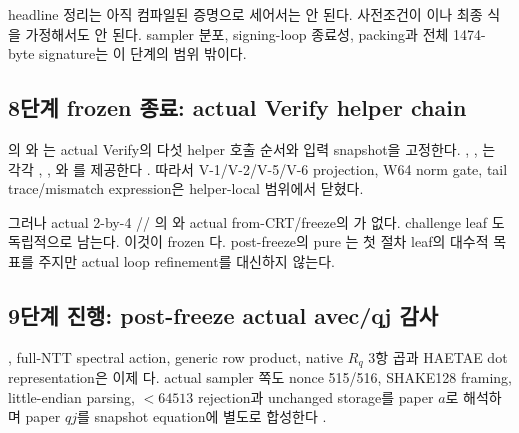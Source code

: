 headline 정리는 아직 컴파일된 증명으로 세어서는 안 된다.
사전조건이 이나 최종 식을 가정해서도 안 된다. sampler
분포, signing-loop 종료성, packing과 전체 1474-byte signature는 이 단계의 범위
밖이다.

\subsection{8단계 frozen 종료: actual Verify helper chain}

의
와
는 actual
Verify의 다섯 helper 호출 순서와 입력 snapshot을 고정한다.
,
,
는 각각
,
,
와
를 제공한다
\cite{week16-verify-report}. 따라서 V-1/V-2/V-5/V-6 projection, W64 norm gate,
tail trace/mismatch expression은 helper-local 범위에서 닫혔다.

그러나 actual 2-by-4
//
의
와 actual from-CRT/freeze의
가 없다. challenge leaf
도 독립적으로 남는다.
이것이 frozen \FrozenPaperGate 다. post-freeze의 pure
는 첫 절차 leaf의 대수적 목표를
주지만 actual loop refinement를 대신하지 않는다.

\subsection{9단계 진행: post-freeze actual avec/qj 감사}

, full-NTT spectral action, generic row
product, native \(R_q\) 3항 곱과 HAETAE dot representation은 이제
\statusproved 다. actual sampler 쪽도 nonce 515/516, SHAKE128 framing,
little-endian parsing, \(<64513\) rejection과 unchanged storage를 paper \(a\)로
해석하며 paper \(qj\)를 snapshot equation에 별도로 합성한다
\cite{post-freeze-kg-rq-haetae-report,
post-freeze-kg-actual-avec-qj-report}.

